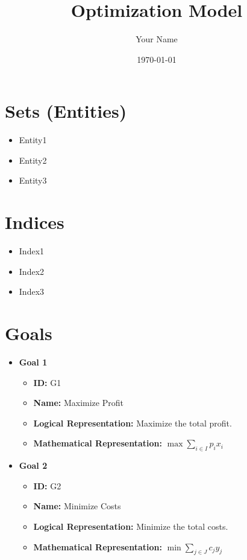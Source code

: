 \documentclass{article}
\title{Optimization Model}
\author{Your Name}
\date{\today}
\begin{document}
\maketitle
\tableofcontents
\newpage

\section{Sets (Entities)}
\begin{itemize}
    \item Entity1
    \item Entity2
    \item Entity3
\end{itemize}

\section{Indices}
\begin{itemize}
    \item Index1
    \item Index2
    \item Index3
\end{itemize}

\section{Goals}
\begin{itemize}
    \item \textbf{Goal 1}
    \begin{itemize}
        \item \textbf{ID:} G1
        \item \textbf{Name:} Maximize Profit
        \item \textbf{Logical Representation:} Maximize the total profit.
        \item \textbf{Mathematical Representation:} $\max \sum_{i \in I} p_i x_i$
    \end{itemize}
    \item \textbf{Goal 2}
    \begin{itemize}
        \item \textbf{ID:} G2
        \item \textbf{Name:} Minimize Costs
        \item \textbf{Logical Representation:} Minimize the total costs.
        \item \textbf{Mathematical Representation:} $\min \sum_{j \in J} c_j y_j$
    \end{itemize}
\end{itemize}
\end{document}
